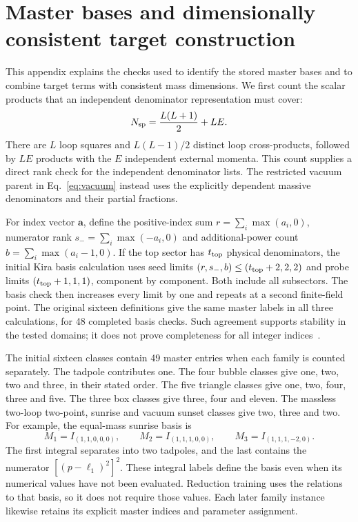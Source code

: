 \section{Master bases and dimensionally consistent target construction}
\label{app:basis}
This appendix explains the checks used to identify the stored master bases and to combine target terms with consistent mass dimensions. We first count the scalar products that an independent denominator representation must cover:
\begin{equation}
 N_{\rm sp}=\frac{L(L+1)}2+LE.
\end{equation}
There are $L$ loop squares and $L(L-1)/2$ distinct loop cross-products, followed by $LE$ products with the $E$ independent external momenta. This count supplies a direct rank check for the independent denominator lists. The restricted vacuum parent in Eq.~\eqref{eq:vacuum} instead uses the explicitly dependent massive denominators and their partial fractions.

For index vector $\boldsymbol a$, define the positive-index sum $r=\sum_i\max(a_i,0)$, numerator rank $s_-=\sum_i\max(-a_i,0)$ and additional-power count $b=\sum_i\max(a_i-1,0)$. If the top sector has $t_{\rm top}$ physical denominators, the initial Kira basis calculation uses seed limits $(r,s_-,b)\leq(t_{\rm top}+2,2,2)$ and probe limits $(t_{\rm top}+1,1,1)$, component by component. Both include all subsectors. The basis check then increases every limit by one and repeats at a second finite-field point. The original sixteen definitions give the same master labels in all three calculations, for 48 completed basis checks. Such agreement supports stability in the tested domains; it does not prove completeness for all integer indices~\cite{KiraOriginal,Kira3}.

The initial sixteen classes contain 49 master entries when each family is counted separately. The tadpole contributes one. The four bubble classes give one, two, two and three, in their stated order. The five triangle classes give one, two, four, three and five. The three box classes give three, four and eleven. The massless two-loop two-point, sunrise and vacuum sunset classes give two, three and two. For example, the equal-mass sunrise basis is
\begin{equation}
 M_1=I_{(1,1,0,0,0)},\qquad M_2=I_{(1,1,1,0,0)},\qquad
 M_3=I_{(1,1,1,-2,0)}.
\end{equation}
The first integral separates into two tadpoles, and the last contains the numerator $[(p-\ell_1)^2]^2$. These integral labels define the basis even when its numerical values have not been evaluated. Reduction training uses the relations to that basis, so it does not require those values. Each later family instance likewise retains its explicit master indices and parameter assignment.

